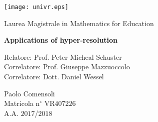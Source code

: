 {
\thispagestyle{empty}

\centerline{
\texttt{[image: univr.eps]}
}

\begin{center}
{\Large  Laurea Magistrale in Mathematics for Education}
\end{center}


\vskip1.5cm
\begin{center}
{\huge \textbf{Applications of hyper-resolution}}
\end{center}

{\large
\vskip2.5cm\noindent Relatore:  Prof. Peter Micheal Schuster\\
Correlatore: Prof. Giuseppe Mazzuoccolo\\
Correlatore: Dott. Daniel Wessel\\
}

\vskip3cm
\hskip9cm\parbox[t]{7cm}
{\large 
Paolo Comensoli\\
Matricola n$^\circ$ VR$407226$\\
A.A. $2017$/$2018$\\
}

\newpage
\newpage
\thispagestyle{empty}
\clearpage
}

